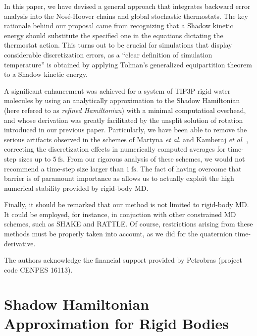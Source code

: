 \documentclass[
	aip,
	jcp,
	reprint,
]{revtex4-1}
\begin{document}
In this paper, we have devised a general approach that integrates backward error analysis into the Nos\'{e}-Hoover chains and global stochastic thermostats.
The key rationale behind our proposal came from recognizing that a Shadow kinetic energy should substitute the specified one in the equations dictating the thermostat action.
This turns out to be crucial for simulations that display considerable discretization errors, as a ``clear definition of simulation temperature''\cite{Eastwood_2010} is obtained by applying Tolman's generalized equipartition theorem to a Shadow kinetic energy.

A significant enhancement was achieved for a system of TIP3P rigid water molecules\cite{Jorgensen_1983} by using an analytically approximation to the Shadow Hamiltonian (here refered to as \textit{refined Hamiltonian}) with a minimal computatioal overhead, and whose derivation was greatly facilitated by the unsplit solution of rotation introduced in our previous paper\cite{Silveira_2017}.
Particularly, we have been able to remove the serious artifacts observed in the schemes of Martyna \textit{et al}. \cite{Martyna_1996} and Kamberaj \textit{et al}. \cite{Kamberaj_2005}, correcting the discretization effects in numerically computed averages for time-step sizes up to $5~\text{fs}$.
From our rigorous analysis of these schemes, we would not recommend a time-step size larger than $1~\text{fs}$.
The fact of having overcome that barrier is of paramount importance as allows us to actually exploit the high numerical stability provided by rigid-body MD.

Finally, it should be remarked that our method is not limited to rigid-body MD. It could be employed, for instance, in conjuction with other constrained MD schemes, such as SHAKE\cite{Ryckaert_1977} and RATTLE\cite{Andersen_1983}.
Of course, restrictions arising from these methods must be properly taken into account, as we did for the quaternion time-derivative.

\begin{acknowledgements}
	The authors acknowledge the financial support provided by Petrobras (project code CENPES 16113).
\end{acknowledgements}

\appendix

\section{Shadow Hamiltonian Approximation for Rigid Bodies}
\label{sec:rigid body shadow hamiltonian}
\end{document}
